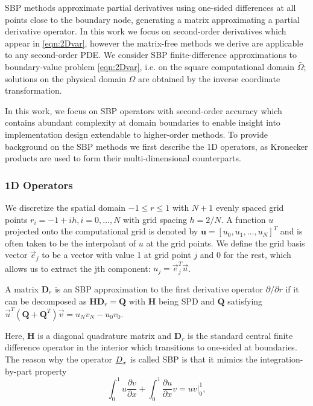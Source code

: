 SBP methods approximate partial derivatives using one-sided differences at all points close to the boundary node, generating a matrix approximating a partial derivative operator. In this work we focus on second-order derivatives which appear in \eqref{eqn:2Dvar}, however the matrix-free methods we derive are applicable to any second-order PDE. We consider SBP finite-difference approximations to boundary-value problem \eqref{eqn:2Dvar}, i.e. on the square computational domain $\bar\Omega$; solutions on the physical domain $\Omega$ are obtained by the inverse coordinate transformation.

In this work, we focus on SBP operators with second-order accuracy which contains abundant complexity at domain boundaries to enable insight into implementation design extendable to higher-order methods.  To provide background on the SBP methods we first describe the 1D operators, as Kronecker products are used to form their multi-dimensional counterparts. 


\subsubsection{1D Operators}

We discretize the spatial domain $-1\leq r \leq 1$ with $N+1$ evenly spaced grid points $r_i = -1 + ih, i=0, \dots, N$ with grid spacing $h = 2/N$. A function $u$ projected onto the computational grid is denoted by $\boldsymbol{u} = [u_0, u_1, \dots, u_N]^T$ and is often taken to be the interpolant of $u$ at the grid points. We define the grid basis vector $\vec{e}_j$ to be a vector with value 1 at grid point $j$ and 0 for the rest, which allows us to extract the jth component: $u_j = \vec{e}_j^T\vec{u}$.  

\begin{definition}
  A matrix $\boldsymbol{D}_{r}$ is an SBP approximation to the first derivative operator $\partial /\partial
  r$ if it can be decomposed as $\boldsymbol{H}\boldsymbol{D}_{r} = \boldsymbol{Q}$ with $\boldsymbol{H}$ being SPD and $\boldsymbol{Q}$ satisfying $\vec{u}^{T}(\boldsymbol{Q} +
  \boldsymbol{Q}^{T})\vec{v} = u_{N}v_{N} - u_{0}v_{0}$.
\end{definition}
%
\noindent Here, $\boldsymbol{H}$ is a diagonal quadrature matrix and  $\boldsymbol{D}_{r}$ is the standard central finite difference operator in the interior which transitions to one-sided at boundaries.
The reason why the operator $\emph{D}_x$ is called SBP is that it mimics the integration-by-part property 
\begin{equation}
  \int_0^1 u \frac{\partial v}{\partial x} + \int_0^1 \frac{\partial u}{\partial x} v = uv\bigg|_0^1,
  \label{eqn:1d_ibp}
\end{equation}

